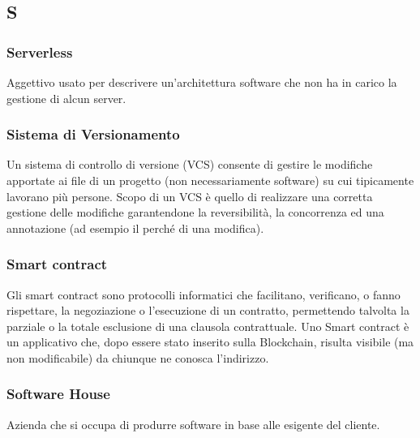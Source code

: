 \subsection*{\textbf{\hfill \Huge{S} \hfill}} 

\subsubsection*{Serverless}
Aggettivo usato per descrivere un'architettura software che non ha in carico la gestione di alcun server.

\subsubsection*{Sistema di Versionamento}
Un sistema di controllo di versione (VCS) consente di gestire le modifiche apportate ai file di un progetto (non necessariamente software) su cui tipicamente lavorano più persone. Scopo di un VCS è quello di realizzare una corretta gestione delle modifiche garantendone la reversibilità, la concorrenza ed una annotazione (ad esempio il perché di una modifica).

\subsubsection*{Smart contract}
Gli smart contract sono protocolli informatici che facilitano, verificano, o fanno rispettare, la negoziazione o l'esecuzione di un contratto, permettendo talvolta la parziale o la totale esclusione di una clausola contrattuale. Uno Smart contract è un applicativo che, dopo essere stato inserito sulla Blockchain\glos, risulta visibile (ma non modificabile) da chiunque ne conosca l'indirizzo.


\subsubsection*{Software House}
Azienda che si occupa di produrre software in base alle esigente del cliente.
